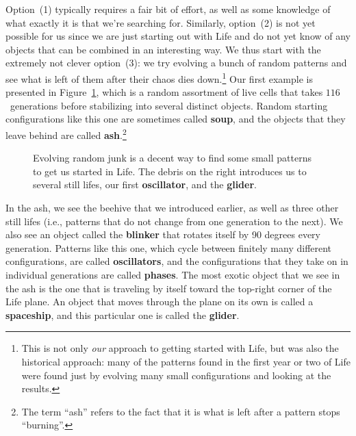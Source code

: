 Option~(1) typically requires a fair bit of effort, as well as some knowledge of what exactly it is that we're searching for. Similarly, option~(2) is not yet possible for us since we are just starting out with Life and do not yet know of any objects that can be combined in an interesting way. We thus start with the extremely not clever option~(3): we try evolving a bunch of random patterns and see what is left of them after their chaos dies down.\footnote{This is not only \emph{our} approach to getting started with Life, but was also the historical approach: many of the patterns found in the first year or two of Life were found just by evolving many small configurations and looking at the results.} Our first example is presented in Figure~\ref{fig:random_1}, which is a random assortment of live cells that takes $116$~generations before stabilizing into several distinct objects. Random starting configurations like this one are sometimes called \textbf{soup}, and the objects that they leave behind are called \textbf{ash}.\footnote{The term ``ash'' refers to the fact that it is what is left after a pattern stops ``burning''.}

\begin{figure}[!htb]
	\centering{}
	\caption{Evolving random junk is a decent way to find some small patterns to get us started in Life. The debris on the right introduces us to several still lifes, our first \textbf{oscillator}, and the \textbf{glider}.}\label{fig:random_1}
\end{figure}

In the ash, we see the beehive that we introduced earlier, as well as three other still lifes (i.e., patterns that do not change from one generation to the next). We also see an object called the \textbf{blinker} that rotates itself by 90 degrees every generation. Patterns like this one, which cycle between finitely many different configurations, are called \textbf{oscillators}, and the configurations that they take on in individual generations are called \textbf{phases}. The most exotic object that we see in the ash is the one that is traveling by itself toward the top-right corner of the Life plane. An object that moves through the plane on its own is called a \textbf{spaceship}, and this particular one is called the \textbf{glider}.

